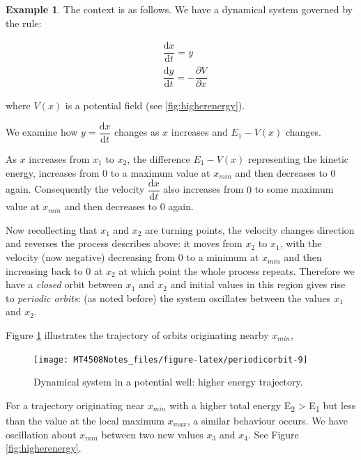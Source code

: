 \documentclass[
  a4paper,
  oneside,
  final]{krantz}
\renewcommand{\d}{\mathrm{d}}
\newcommand{\pder}[2]{\dfrac{\partial #1}{\partial#2}}
\newcommand{\der}[2]{\dfrac{\d #1}{\d #2}}
\theoremstyle{definition}
\theoremstyle{definition}
\newtheorem{example}{Example}[chapter]
\theoremstyle{definition}
\theoremstyle{definition}
\theoremstyle{remark}
\begin{document}
\begin{example}
\protect\hypertarget{exm:lyapunov-motivation-III}{}\label{exm:lyapunov-motivation-III}The context is as follows. We have a dynamical system governed by the rule:

\begin{align}
    &\der{x}{t} =  y \\
    &\der{y}{t} = - \pder{V}{x}
    \label{eq:potential-field-II}
\end{align}

where \(V(x)\) is a potential field (see \ref{fig:higherenergy}).

We examine how \(y = \der{x}{t}\) changes as \(x\) increases and \(E_1 - V(x)\) changes.

As \(x\) increases from \(x_1\) to \(x_2\), the difference \(E_1 - V(x)\) representing the kinetic energy, increases from \(0\) to a maximum value at \(x_{min}\) and then decreases to \(0\) again. Consequently the velocity \(\der{x}{t}\) also increases from \(0\) to some maximum value at \(x_{min}\) and then decreases to \(0\) again.

Now recollecting that \(x_1\) and \(x_2\) are turning points, the velocity changes direction and reverses the process describes above: it moves from \(x_2\) to \(x_1\), with the velocity (now negative) decreasing from \(0\) to a minimum at \(x_{min}\) and then increasing back to \(0\) at \(x_2\) at which point the whole process repeats. Therefore we have a \emph{closed} orbit between \(x_1\) and \(x_2\) and initial values in this region gives rise to \emph{periodic orbits}: (as noted before) the system oscillates between the values \(x_1\) and \(x_2\).

Figure \ref{fig:periodicorbit} illustrates the trajectory of orbits originating nearby \(x_{min}\),

\begin{figure}

{\centering \texttt{[image: MT4508Notes\_files/figure-latex/periodicorbit-9]} 

}

\caption{Dynamical system in a potential well: higher energy trajectory.}\label{fig:periodicorbit}
\end{figure}

For a trajectory originating near \(x_{min}\) with a higher total energy E\textsubscript{2} \textgreater{} E\textsubscript{1} but less than the value at the local maximum \(x_{max}\), a similar behaviour occurs. We have oscillation about \(x_{min}\) between two new values \(x_{3}\) and \(x_4\). See Figure \ref{fig:higherenergy}.


\end{example}
\end{document}
